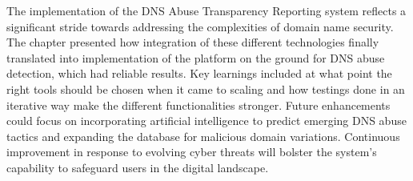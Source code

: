 The implementation of the DNS Abuse Transparency Reporting system reflects a significant stride towards addressing the complexities of domain name security. The chapter presented how integration of these different technologies finally translated into implementation of the platform on the ground for DNS abuse detection, which had reliable results. Key learnings included at what point the right tools should be chosen when it came to scaling and how testings done in an iterative way make the different functionalities stronger. Future enhancements could focus on incorporating artificial intelligence to predict emerging DNS abuse tactics and expanding the database for malicious domain variations. Continuous improvement in response to evolving cyber threats will bolster the system's capability to safeguard users in the digital landscape.
